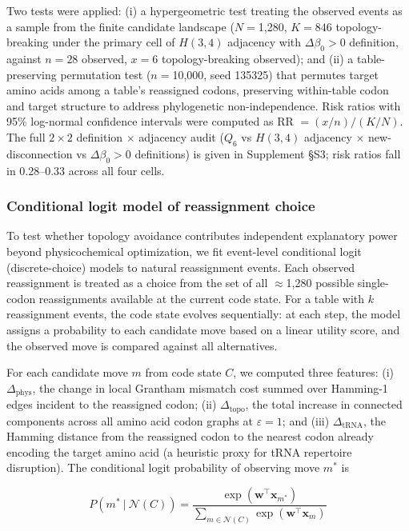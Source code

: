 \documentclass[preprint,11pt,authoryear,a4paper]{elsarticle}
\begin{document}
Two tests were applied: (i) a hypergeometric test treating the observed
events as a sample from the finite candidate landscape (\(N =\)1,280,
\(K = 846\) topology-breaking under the primary cell of \(H(3,4)\)
adjacency with \(\Delta\beta_{0} > 0\) definition, against \(n = 28\)
observed, \(x = 6\) topology-breaking observed); and (ii) a
table-preserving permutation test (\(n =\)10,000, seed 135325) that
permutes target amino acids among a table's reassigned codons,
preserving within-table codon and target structure to address
phylogenetic non-independence. Risk ratios with 95\% log-normal
confidence intervals were computed as \(\text{RR } = (x/n)/(K/N)\). The
full \(2 \times 2\) definition \(\times\) adjacency audit (\(Q_{6}\) vs
\(H(3,4)\) adjacency \(\times\) new-disconnection vs
\(\Delta\beta_{0} > 0\) definitions) is given in Supplement §S3; risk
ratios fall in 0.28--0.33 across all four cells.

\subsubsection{Conditional logit model of reassignment
choice}\label{sec:null-condlogit}

To test whether topology avoidance contributes independent explanatory
power beyond physicochemical optimization, we fit event-level
conditional logit (discrete-choice) models to natural reassignment
events. Each observed reassignment is treated as a choice from the set
of all \(\approx\)1,280 possible single-codon reassignments available at
the current code state. For a table with \(k\) reassignment events, the
code state evolves sequentially: at each step, the model assigns a
probability to each candidate move based on a linear utility score, and
the observed move is compared against all alternatives.

For each candidate move \(m\) from code state \(C\), we computed three
features: (i) \(\Delta_{\text{phys}}\), the change in local Grantham
mismatch cost summed over Hamming-1 edges incident to the reassigned
codon; (ii) \(\Delta_{\text{topo}}\), the total increase in connected
components across all amino acid codon graphs at \(\varepsilon = 1\);
and (iii) \(\Delta_{\text{tRNA}}\), the Hamming distance from the
reassigned codon to the nearest codon already encoding the target amino
acid (a heuristic proxy for tRNA repertoire disruption). The conditional
logit probability of observing move \(m^{\ast}\) is

\[P\left( m^{\ast}~|~\mathcal{N}(C) \right) = \frac{\exp(\mathbf{w}^{\top}\mathbf{x}_{m^{\ast}})}{\sum_{m \in \mathcal{N}(C)}\exp(\mathbf{w}^{\top}\mathbf{x}_{m})}\]
\protect{}\label{eq:condlogit}{}
\end{document}
